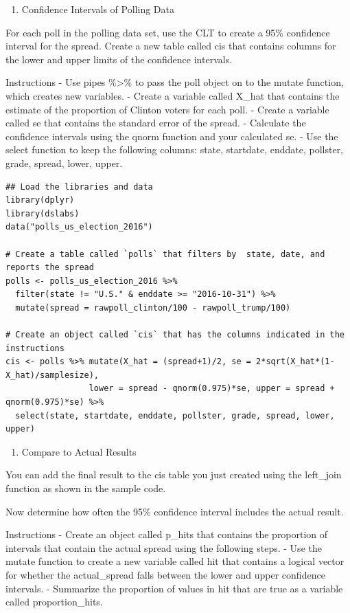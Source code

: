 \documentclass[
]{article}
\providecommand{\tightlist}{%
  \setlength{\itemsep}{0pt}\setlength{\parskip}{0pt}}
\begin{document}
\begin{enumerate}
\def\labelenumi{\arabic{enumi}.}
\tightlist
\item
  Confidence Intervals of Polling Data
\end{enumerate}

For each poll in the polling data set, use the CLT to create a 95\%
confidence interval for the spread. Create a new table called cis that
contains columns for the lower and upper limits of the confidence
intervals.

Instructions - Use pipes \%\textgreater\% to pass the poll object on to
the mutate function, which creates new variables. - Create a variable
called X\_hat that contains the estimate of the proportion of Clinton
voters for each poll. - Create a variable called se that contains the
standard error of the spread. - Calculate the confidence intervals using
the qnorm function and your calculated se. - Use the select function to
keep the following columns: state, startdate, enddate, pollster, grade,
spread, lower, upper.

\begin{verbatim}
## Load the libraries and data
library(dplyr)
library(dslabs)
data("polls_us_election_2016")

# Create a table called `polls` that filters by  state, date, and reports the spread
polls <- polls_us_election_2016 %>% 
  filter(state != "U.S." & enddate >= "2016-10-31") %>% 
  mutate(spread = rawpoll_clinton/100 - rawpoll_trump/100)

# Create an object called `cis` that has the columns indicated in the instructions
cis <- polls %>% mutate(X_hat = (spread+1)/2, se = 2*sqrt(X_hat*(1-X_hat)/samplesize), 
                 lower = spread - qnorm(0.975)*se, upper = spread + qnorm(0.975)*se) %>%
  select(state, startdate, enddate, pollster, grade, spread, lower, upper)
\end{verbatim}

\begin{enumerate}
\def\labelenumi{\arabic{enumi}.}
\setcounter{enumi}{1}
\tightlist
\item
  Compare to Actual Results
\end{enumerate}

You can add the final result to the cis table you just created using the
left\_join function as shown in the sample code.

Now determine how often the 95\% confidence interval includes the actual
result.

Instructions - Create an object called p\_hits that contains the
proportion of intervals that contain the actual spread using the
following steps. - Use the mutate function to create a new variable
called hit that contains a logical vector for whether the actual\_spread
falls between the lower and upper confidence intervals. - Summarize the
proportion of values in hit that are true as a variable called
proportion\_hits.
\end{document}
